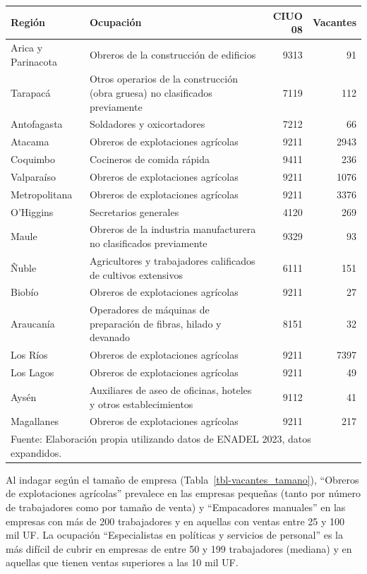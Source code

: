 \documentclass[
  11pt,
]{article}
\begin{document}
\begin{table}
{\centering
\begin{tabular}{l>{\raggedright\arraybackslash}p{7cm}rr}
\toprule
Región & Ocupación & CIUO 08 & Vacantes\\
\midrule
Arica y Parinacota & Obreros de la construcción de edificios & 9313 & 91\\
Tarapacá & Otros operarios de la construcción (obra gruesa) no clasificados previamente & 7119 & 112\\
Antofagasta & Soldadores y oxicortadores & 7212 & 66\\
Atacama & Obreros de explotaciones agrícolas & 9211 & 2943\\
Coquimbo & Cocineros de comida rápida & 9411 & 236\\
\addlinespace
Valparaíso & Obreros de explotaciones agrícolas & 9211 & 1076\\
Metropolitana & Obreros de explotaciones agrícolas & 9211 & 3376\\
O'Higgins & Secretarios generales & 4120 & 269\\
Maule & Obreros de la industria manufacturera no clasificados previamente & 9329 & 93\\
Ñuble & Agricultores y trabajadores calificados de cultivos extensivos & 6111 & 151\\
\addlinespace
Biobío & Obreros de explotaciones agrícolas & 9211 & 27\\
Araucanía & Operadores de máquinas de preparación de fibras, hilado y devanado & 8151 & 32\\
Los Ríos & Obreros de explotaciones agrícolas & 9211 & 7397\\
Los Lagos & Obreros de explotaciones agrícolas & 9211 & 49\\
Aysén & Auxiliares de aseo de oficinas, hoteles y otros establecimientos & 9112 & 41\\
\addlinespace
Magallanes & Obreros de explotaciones agrícolas & 9211 & 217\\
\bottomrule
\multicolumn{4}{l}{\rule{0pt}{1em}Fuente: Elaboración propia utilizando datos de ENADEL 2023, datos expandidos.}\\
\end{tabular}

}

\end{table}%

Al indagar según el tamaño de empresa (Tabla~\ref{tbl-vacantes_tamano}),
``Obreros de explotaciones agrícolas'' prevalece en las empresas
pequeñas (tanto por número de trabajadores como por tamaño de venta) y
``Empacadores manuales'' en las empresas con más de 200 trabajadores y
en aquellas con ventas entre 25 y 100 mil UF. La ocupación
``Especialistas en políticas y servicios de personal'' es la más difícil
de cubrir en empresas de entre 50 y 199 trabajadores (mediana) y en
aquellas que tienen ventas superiores a las 10 mil UF.
\end{document}
